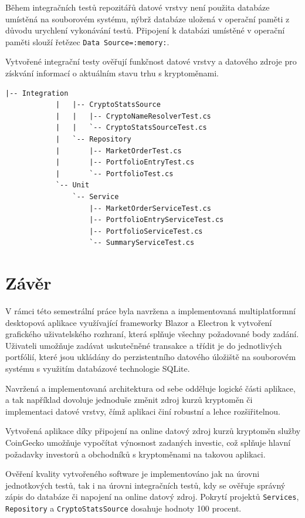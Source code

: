 \documentclass[12pt, a4paper]{article}
\begin{document}
    Během integračních testů repozitářů datové vrstvy není použita databáze umístěná na souborovém systému, nýbrž databáze uložená v operační paměti z důvodu urychlení vykonávání testů. Připojení k databázi umístěné v operační paměti slouží řetězec \texttt{Data Source=:memory:}.

    Vytvořené integrační testy ověřují funkčnost datové vrstvy a datového zdroje pro získvání informací o aktuálním stavu trhu s kryptoměnami.

    \begin{lstlisting}[caption={Struktura projektu \texttt{Tests} obsahující integrační a jednotkové testy}, captionpos=b]
            |-- Integration
            |   |-- CryptoStatsSource
            |   |   |-- CryptoNameResolverTest.cs
            |   |   `-- CryptoStatsSourceTest.cs
            |   `-- Repository
            |       |-- MarketOrderTest.cs
            |       |-- PortfolioEntryTest.cs
            |       `-- PortfolioTest.cs
            `-- Unit
                `-- Service
                    |-- MarketOrderServiceTest.cs
                    |-- PortfolioEntryServiceTest.cs
                    |-- PortfolioServiceTest.cs
                    `-- SummaryServiceTest.cs
    \end{lstlisting}
    
    \section{Závěr}
    V rámci této semestrální práce byla navržena a implementovaná multiplatformní desktopová aplikace využívající frameworky
    Blazor a Electron k vytvoření grafického uživatelského rozhraní, která splňuje všechny požadované body zadání.
    Uživateli umožňuje zadávat uskutečněné transakce a třídit je do jednotlivých portfólií, které jsou ukládány do perzistentního
    datového úložiště na souborovém systému s využitím databázové technologie SQLite.
    
    Navržená a implementovaná architektura od sebe odděluje logické části aplikace, a tak například dovoluje jednoduše změnit zdroj kurzů kryptoměn či implementaci datové vrstvy,
    čímž aplikaci činí robustní a lehce rozšiřitelnou.
    
    Vytvořená aplikace díky připojení na online datový zdroj kurzů kryptoměn služby CoinGecko umožňuje vypočítat výnosnost
    zadaných investic, což splňuje hlavní požadavky investorů a obchodníků s kryptoměnami na takovou aplikaci.
    
    Ověření kvality vytvořeného software je implementováno jak na úrovni jednotkových testů, tak i na úrovni integračních testů,
    kdy se ověřuje správný zápis do databáze či napojení na online datový zdroj. Pokrytí projektů \texttt{Services},
    \texttt{Repository} a \texttt{CryptoStatsSource} dosahuje hodnoty 100 procent.
    
\end{document}
